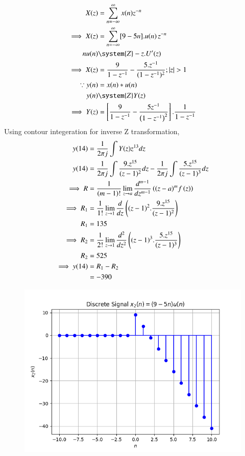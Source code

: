 \documentclass[journal,12pt,twocolumn]{IEEEtran}
\theoremstyle{remark}
\begin{document}
\begin{enumerate} [label=(\roman*)]
    \begin{align}
         X(z) &= \sum_{n = -\infty}^{\infty} x(n) z^{-n} \label{eq:z-transform}\\
        \implies  X(z) &= \sum_{n = -\infty}^{\infty}[9 - 5n].u(n) \, z^{-n} \\
        nu(n) &\system{Z} -z.U'(z)\\
        \implies X(z) &= \dfrac{9}{1-z^{-1}} - \dfrac{5.z^{-1}}{(1-z^{-1})^2} ; |z|>1\\
        \because y(n) &= x(n) * u(n)\\
        y(n) &\system{Z} Y(z) \nonumber\\
        \implies Y(z) &= \left[ \dfrac{9}{1-z^{-1}} - \dfrac{5 z^{-1}}{\left(1-z^{-1}\right)^2} \right].\dfrac{1}{1-z^{-1}}
    \end{align}
    Using contour integeration for inverse Z transformation,\\
    \begin{align}
        y(14) &= \dfrac{1}{2\pi j}\int Y(z) z^{13} dz \\
        y(14) &= \dfrac{1}{2\pi j}\int \dfrac{9.z^{15}}{(z-1)^{2}} dz - \dfrac{1}{2\pi j}\int \dfrac{5.z^{15}}{(z-1)^{3}} dz\\
        \implies R&=\dfrac{1}{\left(m-1\right)!}\lim\limits_{z\to a}\dfrac{d^{m-1}}{dz^{m-1}}\left({(z-a)}^{m}f\left(z\right)\right)\\
        \implies R_1 &=\dfrac{1}{1!}\lim\limits_{z\to 1}\dfrac{d}{dz}\left((z-1)^2.\dfrac{9.z^{15}}{(z-1)^{2}}\right)\\
        R_1 &= 135\\
        \implies R_2 &=\dfrac{1}{2!}\lim\limits_{z\to 1}\dfrac{d^2}{dz^2}\left((z-1)^3.\dfrac{5.z^{15}}{(z-1)^{3}}\right)\\
        R_2 &= 525\\
        \implies y(14) &= R_1 - R_2 \nonumber\\
        &= -390
    \end{align}
    
    \begin{figure}[!h] 
    \centering
    \includegraphics[width=\columnwidth]{figs/signal_x2.png}
    \caption{}
    \label{fig:Graph2}
    \end{figure}

\end{enumerate}
\end{document}

